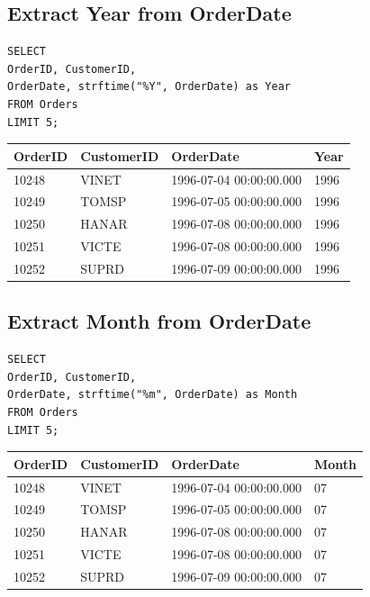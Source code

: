 \documentclass[10pt]{article}
\begin{document}
\subsection{Extract Year from OrderDate}

\begin{verbatim}
SELECT 
OrderID, CustomerID, 
OrderDate, strftime("%Y", OrderDate) as Year
FROM Orders
LIMIT 5;
\end{verbatim}

\begin{table}[H]
\begin{tabular}{|l|l|l|l|}
\hline
OrderID	& CustomerID	& OrderDate	& Year \\
\hline
10248	& VINET	& 1996-07-04 00:00:00.000	& 1996 \\
10249	& TOMSP	& 1996-07-05 00:00:00.000	& 1996 \\
10250	& HANAR	& 1996-07-08 00:00:00.000	& 1996 \\
10251	& VICTE	& 1996-07-08 00:00:00.000	& 1996 \\
10252	& SUPRD	& 1996-07-09 00:00:00.000	& 1996 \\
\hline
\end{tabular}
\end{table}


\subsection{Extract Month from OrderDate}

\begin{verbatim}
SELECT 
OrderID, CustomerID, 
OrderDate, strftime("%m", OrderDate) as Month
FROM Orders
LIMIT 5;
\end{verbatim}


\begin{table}[H]
\begin{tabular}{|l|l|l|l|}
\hline
OrderID	& CustomerID	& OrderDate	& Month \\
\hline
10248	& VINET	& 1996-07-04 00:00:00.000	& 07 \\
10249	& TOMSP	& 1996-07-05 00:00:00.000	& 07 \\
10250	& HANAR	& 1996-07-08 00:00:00.000	& 07 \\
10251	& VICTE	& 1996-07-08 00:00:00.000	& 07 \\
10252	& SUPRD	& 1996-07-09 00:00:00.000	& 07 \\
\hline
\end{tabular}
\end{table}
\end{document}
